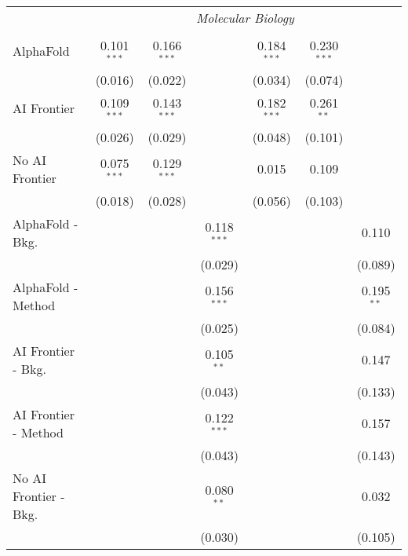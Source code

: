 \begin{tabular}{lcccccc}
 & \multicolumn{6}{c}{\textit{Molecular Biology}} \\ \\
   AlphaFold               & 0.101$^{***}$ & 0.166$^{***}$ &               & 0.184$^{***}$ & 0.230$^{***}$ &   \\   
                           & (0.016)       & (0.022)       &               & (0.034)       & (0.074)       &   \\   
   AI Frontier             & 0.109$^{***}$ & 0.143$^{***}$ &               & 0.182$^{***}$ & 0.261$^{**}$  &   \\   
                           & (0.026)       & (0.029)       &               & (0.048)       & (0.101)       &   \\   
   No AI Frontier          & 0.075$^{***}$ & 0.129$^{***}$ &               & 0.015         & 0.109         &   \\   
                           & (0.018)       & (0.028)       &               & (0.056)       & (0.103)       &   \\   
   AlphaFold - Bkg.        &               &               & 0.118$^{***}$ &               &               & 0.110\\   
                           &               &               & (0.029)       &               &               & (0.089)\\   
   AlphaFold - Method      &               &               & 0.156$^{***}$ &               &               & 0.195$^{**}$\\   
                           &               &               & (0.025)       &               &               & (0.084)\\   
   AI Frontier - Bkg.      &               &               & 0.105$^{**}$  &               &               & 0.147\\   
                           &               &               & (0.043)       &               &               & (0.133)\\   
   AI Frontier - Method    &               &               & 0.122$^{***}$ &               &               & 0.157\\   
                           &               &               & (0.043)       &               &               & (0.143)\\   
   No AI Frontier - Bkg.   &               &               & 0.080$^{**}$  &               &               & 0.032\\   
                           &               &               & (0.030)       &               &               & (0.105)\\   

\end{tabular}
